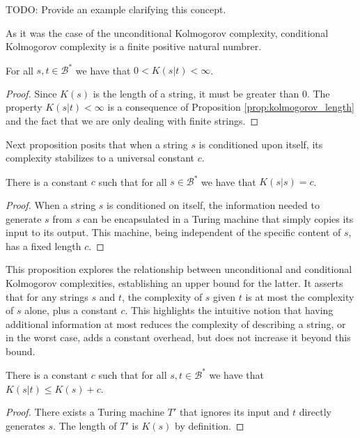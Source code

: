 \begin{example}
{\color{red} TODO: Provide an example clarifying this concept.}
\end{example}

As it was the case of the unconditional Kolmogorov complexity, conditional Kolmogorov complexity is a finite positive natural numbrer.

\begin{proposition}
For all $s, t \in\mathcal{B}^{\ast}$ we have that $0 < K(s | t) < \infty$.
\end{proposition}
\begin{proof}
Since $K(s)$ is the length of a string, it must be greater than $0$. The property $K(s | t) < \infty$ is a consequence of Proposition \ref{prop:kolmogorov_length} and the fact that we are only dealing with finite strings.
\end{proof}

Next proposition posits that when a string $s$ is conditioned upon itself, its complexity stabilizes to a universal constant $c$.

\begin{proposition}
\label{prop:self_conditional}
There is a constant $c$ such that for all $s\in\mathcal{B}^{\ast}$ we have that $K(s | s ) = c$.
\end{proposition}
\begin{proof}
When a string $s$ is conditioned on itself, the information needed to generate $s$ from $s$ can be encapsulated in a Turing machine that simply copies its input to its output. This machine, being independent of the specific content of $s$, has a fixed length $c$. 
\end{proof}

This proposition explores the relationship between unconditional and conditional Kolmogorov complexities, establishing an upper bound for the latter. It asserts that for any strings $s$ and $t$, the complexity of $s$ given $t$ is at most the complexity of $s$ alone, plus a constant $c$. This highlights the intuitive notion that having additional information at most reduces the complexity of describing a string, or in the worst case, adds a constant overhead, but does not increase it beyond this bound.

\begin{proposition}
\label{prop:kolmogorov_conditional}
There is a constant $c$ such that for all $s, t \in \mathcal{B}^{\ast}$ we have that $K(s | t ) \leq K(s) + c$.
\end{proposition}
\begin{proof}
There exists a Turing machine $T'$ that ignores its input and $t$ directly generates $s$. The length of $T'$ is $K(s)$ by definition.
\end{proof}

